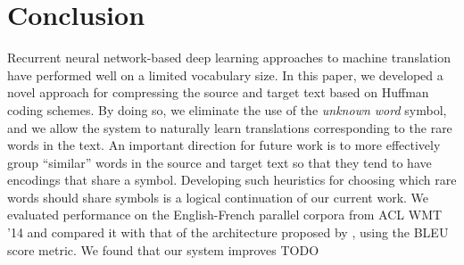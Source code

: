 \section{Conclusion}
\label{sec:conclusion}

Recurrent neural network-based deep learning approaches
to machine translation have performed well on a limited vocabulary
size. In this paper, we developed a novel approach for compressing
the source and target text based on Huffman coding schemes. By doing
so, we eliminate the use of the \emph{unknown word} symbol,
and we allow the system to naturally learn translations corresponding
to the rare words in the text. An important direction for future work is to more effectively
group ``similar'' words in the source and target text so that they tend to have
encodings that share a symbol. Developing such heuristics for choosing which rare words should share symbols
is a logical continuation of our current work. We evaluated performance on the English-French
parallel corpora from ACL WMT '14 and compared it with that of the architecture
proposed by , using the BLEU score metric.
We found that our system improves TODO\\